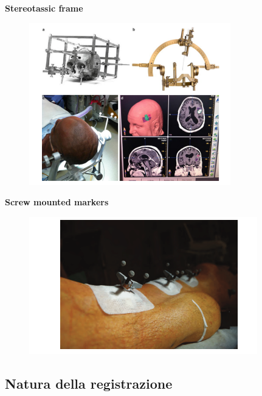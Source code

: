 \textbf{Stereotassic frame}
\begin{figure}[H]
    \centering
    \includegraphics[width=\linewidth, keepaspectratio]{capitoli/immagini/imgs/strssotic-frame.png}
\end{figure}

\newpage
\textbf{Screw mounted markers}
\begin{figure}[H]
    \centering
    \includegraphics[width=\linewidth, keepaspectratio]{capitoli/immagini/imgs/screw-mounted-markes.png}
\end{figure}

\subsection{Natura della registrazione}

